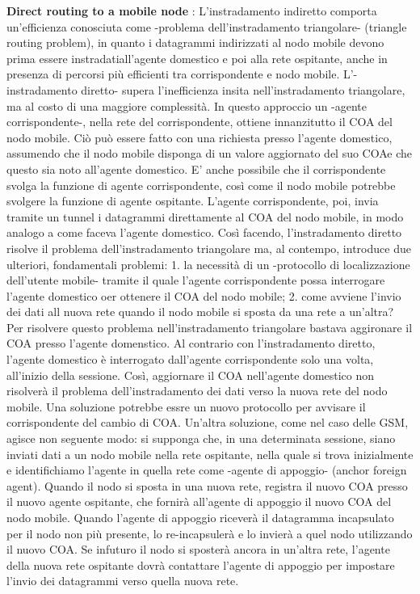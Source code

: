 \documentclass[a4paper,10pt]{article} %
\renewcommand{\b}[1]{%
    {\textbf{#1}}}
\begin{document}
\b{ Direct routing to a mobile node }: L'instradamento indiretto comporta un'efficienza conosciuta come -problema dell'instradamento triangolare- (triangle routing problem), in quanto i datagrammi indirizzati al nodo mobile devono prima essere instradatiall'agente domestico e poi alla rete ospitante, anche in presenza di percorsi più efficienti tra corrispondente e nodo mobile. L'-instradamento diretto- supera l'inefficienza insita nell'instradamento triangolare, ma al costo di una maggiore complessità. In questo approccio un -agente corrispondente-, nella rete del corrispondente, ottiene innanzitutto il COA del nodo mobile. Ciò può essere fatto con una richiesta presso l'agente domestico, assumendo che il nodo mobile disponga di un valore aggiornato del suo COAe che questo sia noto all'agente domestico. E' anche possibile che il corrispondente svolga la funzione di agente corrispondente, così come il nodo mobile potrebbe svolgere la funzione di agente ospitante. L'agente corrispondente, poi, invia tramite un tunnel i datagrammi direttamente al COA del nodo mobile, in modo analogo a come faceva l'agente domestico. Così facendo, l'instradamento diretto risolve il problema dell'instradamento triangolare ma, al contempo, introduce due ulteriori, fondamentali problemi: 1. la necessità di un -protocollo di localizzazione dell'utente mobile- tramite il quale l'agente corrispondente possa interrogare l'agente domestico oer ottenere il COA del nodo mobile; 2. come avviene l'invio dei dati all nuova rete quando il nodo mobile si sposta da una rete a un'altra? Per risolvere questo problema nell'instradamento triangolare bastava aggironare il COA presso l'agente domenstico. Al contrario con l'instradamento diretto, l'agente domestico è interrogato dall'agente corrispondente solo una volta, all'inizio della sessione. Così, aggiornare il COA nell'agente domestico non risolverà il problema dell'instradamento dei dati verso la nuova rete del nodo mobile. Una soluzione potrebbe essre un nuovo protocollo per avvisare il corrispondente del cambio di COA. Un'altra soluzione, come nel caso delle GSM, agisce non seguente modo: si supponga che, in una determinata sessione, siano inviati dati a un nodo mobile nella rete ospitante, nella quale si trova  inizialmente e identifichiamo l'agente in  quella rete come -agente di appoggio- (anchor foreign agent). Quando il nodo si sposta in una nuova rete, registra il nuovo COA presso il nuovo agente ospitante, che fornirà all'agente di appoggio il nuovo COA del nodo mobile. Quando l'agente di appoggio riceverà il datagramma incapsulato per il nodo non più presente, lo re-incapsulerà e lo invierà a quel nodo utilizzando il nuovo COA. Se infuturo il nodo si sposterà ancora in un'altra rete, l'agente della nuova rete ospitante dovrà contattare l'agente di appoggio per impostare l'invio dei datagrammi verso quella nuova rete. 
\end{document}
